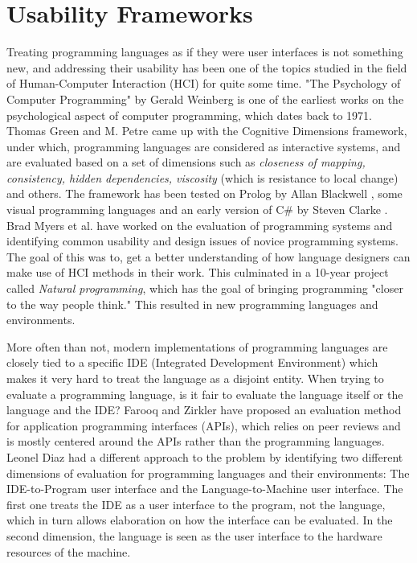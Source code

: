 \section{Usability Frameworks}
Treating programming languages as if they were user interfaces is not something new, and addressing their usability has been one of the topics studied in the field of Human-Computer Interaction (HCI) for quite some time. "The Psychology of Computer Programming" by Gerald Weinberg \cite{GWeinberg} is one of the earliest works on the psychological aspect of computer programming, which dates back to 1971. Thomas Green and M. Petre \cite{CognitiveDimensions} came up with the Cognitive Dimensions framework, under which, programming languages are considered as interactive systems, and are evaluated based on a set of dimensions such as \textit{closeness of mapping, consistency, hidden dependencies, viscosity} (which is resistance to local change) and others. The framework has been tested on Prolog by Allan Blackwell \cite{CognitiveDimensions2}, some visual programming languages \cite{InstructsDescripts}\cite{InformationArtefacts}\cite{CognitiveDimensions} and an early version of C\# by Steven Clarke \cite{NewLangEval}. Brad Myers et al. \cite{NaturalProgramming} have worked on the evaluation of programming systems and identifying common usability and design issues of novice programming systems.
The goal of this was to, get a better understanding of how language designers can make use of HCI methods in their work. This culminated in a 10-year project called \textit{Natural programming}, which has the goal of bringing programming "closer to the way people think." This resulted in new programming languages and environments\cite{NaturalProgrammingEnvironment}. 

More often than not, modern implementations of programming languages are closely tied to a specific IDE (Integrated Development Environment) which makes it very hard to treat the language as a disjoint entity. When trying to evaluate a programming language, is it fair to evaluate the language itself or the language and the IDE? Farooq and Zirkler \cite{APPPeer} have proposed an evaluation method for application programming interfaces (APIs), which relies on peer reviews and is mostly centered around the APIs rather than the programming languages. Leonel Diaz \cite{LangsasUI} had a different approach to the problem by identifying two different dimensions of evaluation for programming languages and their environments: The IDE-to-Program user interface and the Language-to-Machine user interface. The first one treats the IDE as a user interface to the program, not the language, which in turn allows elaboration on how the interface can be evaluated. In the second dimension, the language is seen as the user interface to the hardware resources of the machine.

